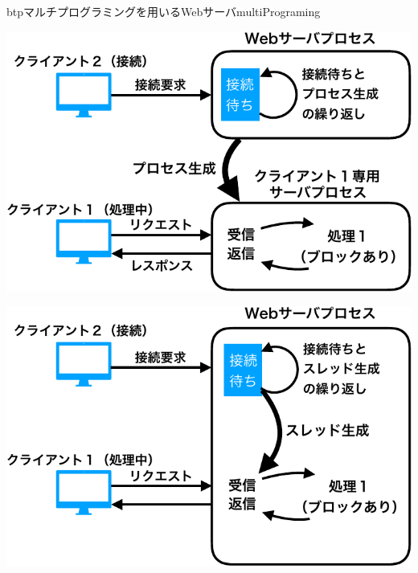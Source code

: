\begin{itemize}
  \begin{myfig}{btp}{マルチプログラミングを用いるWebサーバ}{multiPrograming}
    \begin{minipage}{0.49\columnwidth}
      \begin{center}
        \includegraphics[scale=0.6]{Fig/multiProc-crop.pdf}
        \label{fig:multiProc}
      \end{center}
    \end{minipage}
    \begin{minipage}{0.49\columnwidth}
      \begin{center}
        \includegraphics[scale=0.6]{Fig/multiThread-crop.pdf}
        \label{fig:multiThread}
      \end{center}
    \end{minipage}
  \end{myfig}
\end{itemize}


